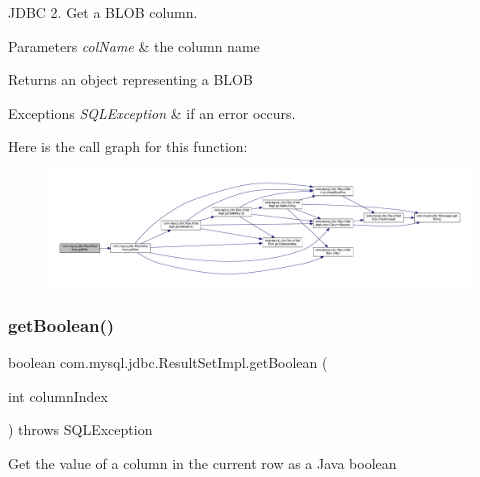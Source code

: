J\+D\+BC 2. Get a B\+L\+OB column.


\begin{DoxyParams}{Parameters}
{\em col\+Name} & the column name\\
\hline
\end{DoxyParams}
\begin{DoxyReturn}{Returns}
an object representing a B\+L\+OB
\end{DoxyReturn}

\begin{DoxyExceptions}{Exceptions}
{\em S\+Q\+L\+Exception} & if an error occurs. \\
\hline
\end{DoxyExceptions}
Here is the call graph for this function\+:
\nopagebreak
\begin{figure}[H]
\begin{center}
\leavevmode
\includegraphics[width=350pt]{classcom_1_1mysql_1_1jdbc_1_1_result_set_impl_a4ff048c74bbfa3ff0584ac97b8679e84_cgraph}
\end{center}
\end{figure}
\mbox{\label{classcom_1_1mysql_1_1jdbc_1_1_result_set_impl_ad64d18ed9c29fd6ab29f1770b2184d6e}} 
\subsubsection{\texorpdfstring{get\+Boolean()}{getBoolean()}\hspace{0.1cm}{\footnotesize\ttfamily [1/2]}}
{\footnotesize\ttfamily boolean com.\+mysql.\+jdbc.\+Result\+Set\+Impl.\+get\+Boolean (\begin{DoxyParamCaption}\item[{int}]{column\+Index }\end{DoxyParamCaption}) throws S\+Q\+L\+Exception}

Get the value of a column in the current row as a Java boolean


